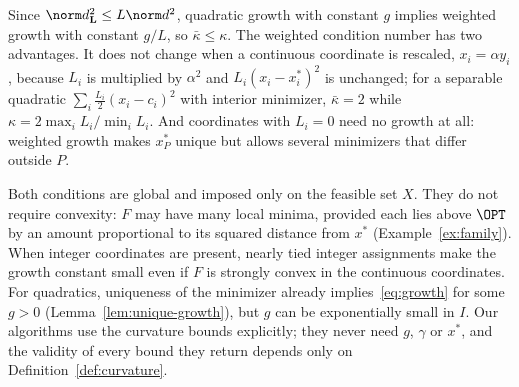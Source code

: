 Since $\norm d_{\mathbf L}^2\le L\norm d^2$, quadratic growth with constant
$g$ implies weighted growth with constant $g/L$, so $\bar\kappa\le\kappa$. The
weighted condition number has two advantages. It does not change when a
continuous coordinate is rescaled, $x_i=\alpha y_i$, because $L_i$ is multiplied
by $\alpha^2$ and $L_i(x_i-x_i^*)^2$ is unchanged; for a separable quadratic
$\sum_i\frac{L_i}{2}(x_i-c_i)^2$ with interior minimizer, $\bar\kappa=2$ while
$\kappa=2\max_iL_i/\min_iL_i$. And coordinates with $L_i=0$ need no growth at
all: weighted growth makes $x^*_P$ unique but allows several minimizers that
differ outside $P$.

Both conditions are global and imposed only on the feasible set $X$. They do
not require convexity: $F$ may have many local minima, provided each lies above
$\OPT$ by an amount proportional to its squared distance from $x^*$
(Example~\ref{ex:family}). When integer coordinates are present, nearly tied
integer assignments make the growth constant small even if $F$ is strongly
convex in the continuous coordinates. For quadratics, uniqueness of the
minimizer already implies~\eqref{eq:growth} for some $g>0$
(Lemma~\ref{lem:unique-growth}), but $g$ can be exponentially small in $I$.
Our algorithms use the curvature bounds explicitly; they never need $g$,
$\gamma$ or $x^*$, and the validity of every bound they return depends only on
Definition~\ref{def:curvature}.

